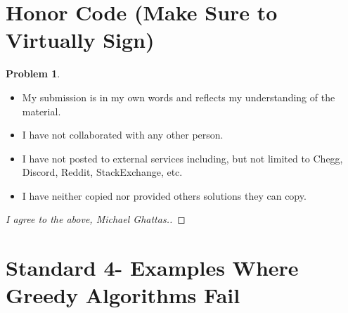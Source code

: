 \documentclass[11pt]{article}
\theoremstyle{definition}
\theoremstyle{definition}
\newtheorem{required}{Problem}
\theoremstyle{definition}
\begin{document}
\section{Honor Code (Make Sure to Virtually Sign)} \label{HonorCode}

\begin{required}
\noindent 
\begin{itemize}
\item My submission is in my own words and reflects my understanding of the material.
\item I have not collaborated with any other person.
\item I have not posted to external services including, but not limited to Chegg, Discord, Reddit, StackExchange, etc.
\item I have neither copied nor provided others solutions they can copy.
\end{itemize}

\end{required}

\begin{proof}[I agree to the above, Michael Ghattas.]
\end{proof}


\newpage
\section{Standard 4- Examples Where Greedy Algorithms Fail}
\end{document}
